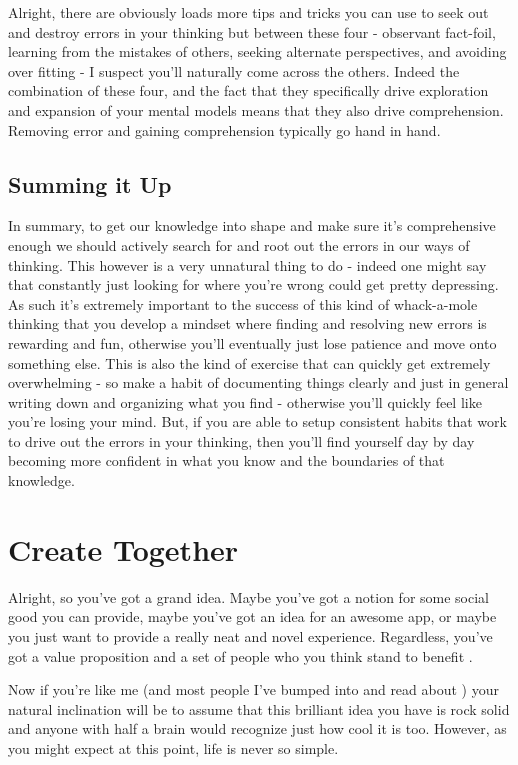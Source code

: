 \documentclass[11pt]{book}
\begin{document}
Alright, there are obviously loads more tips and tricks you can use to seek out and destroy errors in your thinking but between these four - observant fact-foil, learning from the mistakes of others, seeking alternate perspectives, and avoiding over fitting - I suspect you'll naturally come across the others. Indeed the combination of these four, and the fact that they specifically drive exploration and expansion of your mental models means that they also drive comprehension. Removing error and gaining comprehension typically go hand in hand. 




\subsection{Summing it Up}
In summary, to get our knowledge into shape and make sure it's comprehensive enough we should actively search for and root out the errors in our ways of thinking. This however is a very unnatural thing to do - indeed one might say that constantly just looking for where you're wrong could get pretty depressing. As such it's extremely important to the success of this kind of whack-a-mole thinking that you develop a mindset where finding and resolving new errors is rewarding and fun, otherwise you'll eventually just lose patience and move onto something else. This is also the kind of exercise that can quickly get extremely overwhelming - so make a habit of documenting things clearly and just in general writing down and organizing what you find - otherwise you'll quickly feel like you're losing your mind. But, if you are able to setup consistent habits that work to drive out the errors in your thinking, then you'll find yourself day by day becoming more confident in what you know and the boundaries of that knowledge.

\section{Create Together}
Alright, so you've got a grand idea. Maybe you've got a notion for some social good you can provide, maybe you've got an idea for an awesome app, or maybe you just want to provide a really neat and novel experience. Regardless, you've got a value proposition and a set of people who you think stand to benefit \cite{valueprop}. 
\newline

Now if you're like me (and most people I've bumped into and read about \cite{patton}) your natural inclination will be to assume that this brilliant idea you have is rock solid and anyone with half a brain would recognize just how cool it is too. However, as you might expect at this point, life is never so simple. 
\newline
\end{document}
